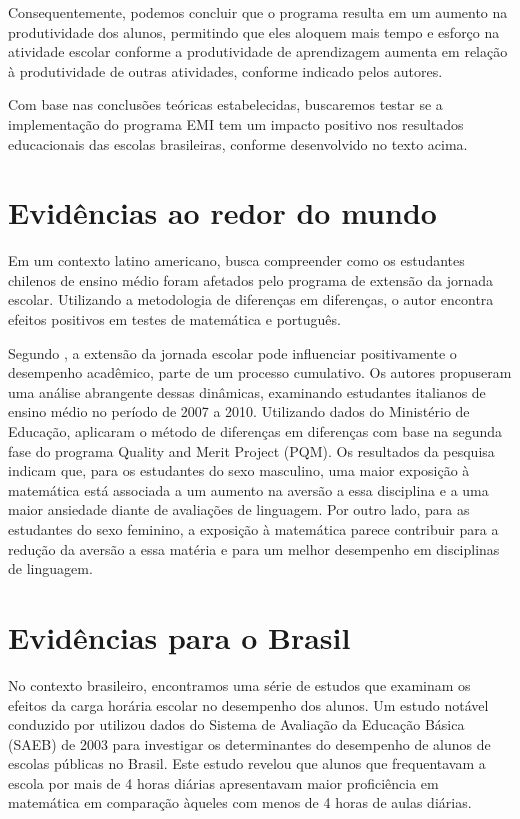 Consequentemente, podemos concluir que o programa resulta em um aumento na produtividade dos alunos, permitindo que eles aloquem mais tempo e esforço na atividade escolar conforme a produtividade de aprendizagem aumenta em relação à produtividade de outras atividades, conforme indicado pelos autores.

Com base nas conclusões teóricas estabelecidas, buscaremos testar se a implementação do programa EMI tem um impacto positivo nos resultados educacionais das escolas brasileiras, conforme desenvolvido no texto acima.
 
\section{Evidências ao redor do mundo}

Em um contexto latino americano, \cite{Bellei_2009} busca compreender como os estudantes chilenos de ensino médio foram afetados pelo programa de extensão da jornada escolar. Utilizando a metodologia de diferenças em diferenças, o autor encontra efeitos positivos em testes de matemática e português.

Segundo \cite{Meroni_2016}, a extensão da jornada escolar pode influenciar positivamente o desempenho acadêmico, parte de um processo cumulativo. Os autores propuseram uma análise abrangente dessas dinâmicas, examinando estudantes italianos de ensino médio no período de 2007 a 2010. Utilizando dados do Ministério de Educação, aplicaram o método de diferenças em diferenças com base na segunda fase do programa Quality and Merit Project (PQM). Os resultados da pesquisa indicam que, para os estudantes do sexo masculino, uma maior exposição à matemática está associada a um aumento na aversão a essa disciplina e a uma maior ansiedade diante de avaliações de linguagem. Por outro lado, para as estudantes do sexo feminino, a exposição à matemática parece contribuir para a redução da aversão a essa matéria e para um melhor desempenho em disciplinas de linguagem.

\section{Evidências para o Brasil}

No contexto brasileiro, encontramos uma série de estudos que examinam os efeitos da carga horária escolar no desempenho dos alunos. Um estudo notável conduzido por \cite{Filho_2012} utilizou dados do Sistema de Avaliação da Educação Básica (SAEB) de 2003 para investigar os determinantes do desempenho de alunos de escolas públicas no Brasil. Este estudo revelou que alunos que frequentavam a escola por mais de 4 horas diárias apresentavam maior proficiência em matemática em comparação àqueles com menos de 4 horas de aulas diárias.

